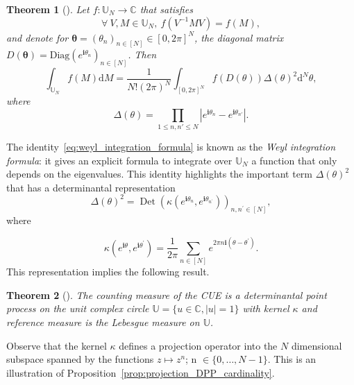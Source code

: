 \documentclass[twoside,11pt]{book}
\newtheorem{theorem}{Theorem}
\numberwithin{theorem}{chapter}
\numberwithin{definition}{chapter}
\numberwithin{proposition}{chapter}
\numberwithin{corollary}{chapter}
\numberwithin{example}{chapter}
\numberwithin{lemma}{chapter}
\numberwithin{assumption}{chapter}
\DeclareMathOperator{\Det}{Det}
\begin{document}
\begin{theorem}[\cite{Wey46}]
Let $f: \mathbb{U}_{N} \rightarrow \mathbb{C}$ that satisfies
\begin{equation}\label{eq:weil_condition}
\forall \: V, M \in \mathbb{U}_{N}, \:  f(V^{-1}M V) = f(M),
\end{equation}
and denote for $\bm{\theta} = (\theta_{n})_{n \in [N]} \in [0,2\pi]^{N}$, the diagonal matrix $D(\bm{\theta}) = \mathrm{Diag}(e^{\mathbf{i} \theta_{n}})_{n \in [N]}$.
Then
\begin{equation}\label{eq:weyl_integration_formula}
\int_{\mathbb{U}_{N}}f(M) \mathrm{d}M = \frac{1}{N!(2 \pi)^{N}} \int_{[0,2\pi]^{N}} f(D(\theta)) \Delta(\theta)^{2} \mathrm{d}^{N}\theta,
\end{equation}
where 
\begin{equation}
\Delta(\theta) = \prod\limits_{1 \leq n,n' \leq N} | e^{\mathbf{i} \theta_{n}} -e^{\mathbf{i} \theta_{n'}} |.
\end{equation}
\end{theorem}
The identity~\eqref{eq:weyl_integration_formula} is known as the \emph{Weyl integration formula}: it gives an explicit formula to integrate  over $\mathbb{U}_N$ a function that only depends on the eigenvalues. This identity highlights the important term $\Delta(\theta)^{2}$ that has a determinantal representation
\begin{equation}
\Delta(\theta)^{2} = \Det (\kappa(e^{\mathbf{i}\theta_{n}},e^{\mathbf{i}\theta_{n^{'}}}))_{n,n^{'} \in [N]},
\end{equation}
where

\begin{equation}
\kappa(e^{\mathbf{i}\theta},e^{\mathbf{i}\theta^{'}}) = \frac{1}{2 \pi}\sum\limits_{n \in [N]} e^{2 \pi n \mathbf{i}(\theta-\theta^{'})}.
\end{equation}
This representation implies the following result.
\begin{theorem}[\cite{Dys62}]\label{thm:CUE_is_DPP}
The counting measure of the CUE is a determinantal point process on the unit complex circle $\mathbb{U} = \{ u \in \mathbb{C}, |u| =1 \}$ with kernel $\kappa$ and reference measure is the Lebesgue measure on $\mathbb{U}$.

\end{theorem}

Observe that the kernel $\kappa$ defines a projection operator into the $N$ dimensional subspace spanned by the functions $z \mapsto z^{n}$; n $\in \{0, \dots, N-1 \}$. This is an illustration of Proposition~\ref{prop:projection_DPP_cardinality}. 
\end{document}
